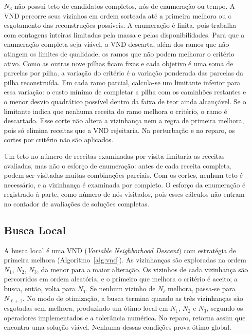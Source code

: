 \documentclass[conference]{IEEEtran}
\begin{document}
$N_3$ não possui teto de candidatos completos, nós de enumeração ou tempo. A VND percorre seus vizinhos em ordem sorteada até a primeira melhora ou o esgotamento das reconstruções possíveis. A enumeração é finita, pois trabalha com contagens inteiras limitadas pela massa e pelas disponibilidades. Para que a enumeração completa seja viável, a VND descarta, além dos ramos que não atingem os limites de qualidade, os ramos que não podem melhorar o critério ativo. Como as outras nove pilhas ficam fixas e cada objetivo é uma soma de parcelas por pilha, a variação do critério é a variação ponderada das parcelas da pilha reconstruída. Em cada ramo parcial, calcula-se um limitante inferior para essa variação: o custo mínimo de completar a pilha com os caminhões restantes e o menor desvio quadrático possível dentro da faixa de teor ainda alcançável. Se o limitante indica que nenhuma receita do ramo melhora o critério, o ramo é descartado. Esse corte não altera a vizinhança nem a regra de primeira melhora, pois só elimina receitas que a VND rejeitaria. Na perturbação e no reparo, os cortes por critério não são aplicados.

Um teto no número de receitas examinadas por visita limitaria as receitas avaliadas, mas não o esforço de enumeração: antes de cada receita completa, podem ser visitadas muitas combinações parciais. Com os cortes, nenhum teto é necessário, e a vizinhança é examinada por completo. O esforço da enumeração é registrado à parte, como número de nós visitados, pois esses cálculos não entram no contador de avaliações de soluções completas.

\subsection{Busca Local}

A busca local é uma VND (\textit{Variable Neighborhood Descent}) com estratégia de primeira melhora (Algoritmo~\ref{alg:vnd}). As vizinhanças são exploradas na ordem $N_1$, $N_2$, $N_3$, da menor para a maior alteração. Os vizinhos de cada vizinhança são percorridos em ordem aleatória, e o primeiro que melhora o critério é aceito; a busca, então, volta para $N_1$. Se nenhum vizinho de $N_\ell$ melhora, passa-se para $N_{\ell+1}$. No modo de otimização, a busca termina quando as três vizinhanças são esgotadas sem melhora, produzindo um ótimo local em $N_1$, $N_2$ e $N_3$, segundo os operadores implementados e a tolerância numérica. No reparo, retorna assim que encontra uma solução viável. Nenhuma dessas condições prova ótimo global.
\end{document}
